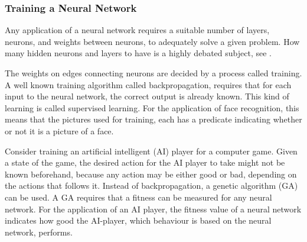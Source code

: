 \subsubsection{Training a Neural Network}
Any applica\-tion of a neural network requires a suitable number of layers, neurons, and weights between neurons, to adequately solve a given problem. How many hidden neurons and layers to have is a highly debated subject, see \cite{sarle1997}.

The weights on edges connecting neurons are decided by a process called training. 
A well known training algorithm called backpropagation, requires that for each input to the neural network, the correct output is already known\cite{backpropagation}. This kind of learning is called supervised learning. For the application of face recognition, this means that the pictures used for training, each has a predicate indicating whether or not it is a picture of a face.

Consider training an artificial intelligent (AI) player for a computer game. Given a state of the game, the desired action for the AI player to take might not be known beforehand, because any action may be either good or bad, depending on the actions that follows it. 
Instead of backpropagation, a genetic algorithm (GA) can be used.
A GA requires that a fitness can be measured for any neural network.
For the application of an AI player, the fitness value of a neural network indicates how good the AI-player, which behaviour is based on the neural network, performs.